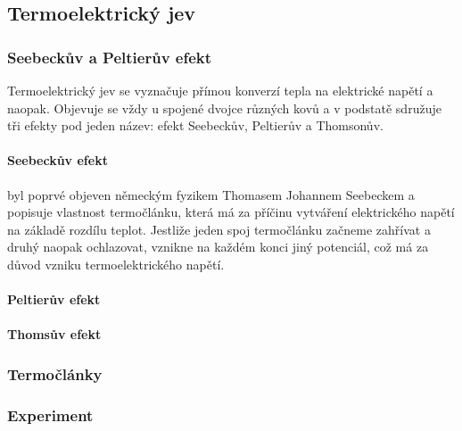 \subsection{Termoelektrický jev}
\subsubsection{Seebeckův a Peltierův efekt}
Termoelektrický jev se vyznačuje přímou konverzí tepla na elektrické napětí 
a naopak. Objevuje se vždy u spojené dvojce různých kovů a v podstatě sdružuje
tři efekty pod jeden název: efekt Seebeckův, Peltierův a Thomsonův.

\paragraph{Seebeckův efekt} byl poprvé objeven německým fyzikem Thomasem
Johannem Seebeckem a popisuje vlastnost termočlánku, která má za příčinu
vytváření elektrického napětí na základě rozdílu teplot. Jestliže jeden spoj
termočlánku začneme zahřívat a druhý naopak ochlazovat, vznikne na každém konci
jiný potenciál, což má za důvod vzniku termoelektrického napětí. \cite{jreichl}

\paragraph{Peltierův efekt}
\paragraph{Thomsův efekt}

\subsubsection{Termočlánky}

\subsubsection{Experiment}
